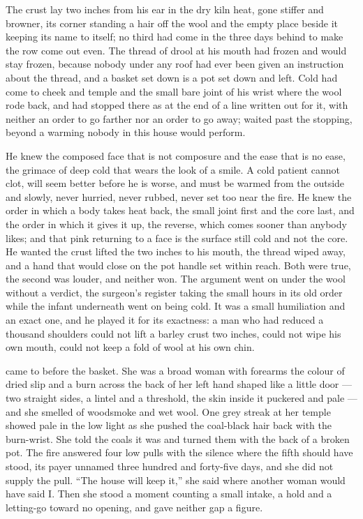 The crust lay two inches from his ear in the dry kiln heat, gone stiffer and browner, its corner standing a hair off the wool and the empty place beside it keeping its name to itself; no third had come in the three days behind to make the row come out even. The thread of drool at his mouth had frozen and would stay frozen, because nobody under any roof had ever been given an instruction about the thread, and a basket set down is a pot set down and left. Cold had come to cheek and temple and the small bare joint of his wrist where the wool rode back, and had stopped there as at the end of a line written out for it, with neither an order to go farther nor an order to go away;  waited past the stopping, beyond a warming nobody in this house would perform.

He knew the composed face that is not composure and the ease that is no ease, the grimace of deep cold that wears the look of a smile. A cold patient cannot clot, will seem better before he is worse, and must be warmed from the outside and slowly, never hurried, never rubbed, never set too near the fire. He knew the order in which a body takes heat back, the small joint first and the core last, and the order in which it gives it up, the reverse, which comes sooner than anybody likes; and that pink returning to a face is the surface still cold and not the core. He wanted the crust lifted the two inches to his mouth, the thread wiped away, and a hand that would close on the pot handle set within reach. Both were true, the second was louder, and neither won. The argument went on under the wool without a verdict, the surgeon's register taking the small hours in its old order while the infant underneath went on being cold. It was a small humiliation and an exact one, and he played it for its exactness: a man who had reduced a thousand shoulders could not lift a barley crust two inches, could not wipe his own mouth, could not keep a fold of wool at his own chin.

\scenebreak

 came to  before the basket. She was a broad woman with forearms the colour of dried slip and a burn across the back of her left hand shaped like a little door --- two straight sides, a lintel and a threshold, the skin inside it puckered and pale --- and she smelled of woodsmoke and wet wool. One grey streak at her temple showed pale in the low light as she pushed the coal-black hair back with the burn-wrist. She told the coals it was  and turned them with the back of a broken pot. The fire answered four low pulls with the silence where the fifth should have stood, its payer unnamed three hundred and forty-five days, and she did not supply the pull. “The house will keep it,” she said where another woman would have said I. Then she stood a moment counting a small intake, a hold and a letting-go toward no opening, and gave neither gap a figure.

